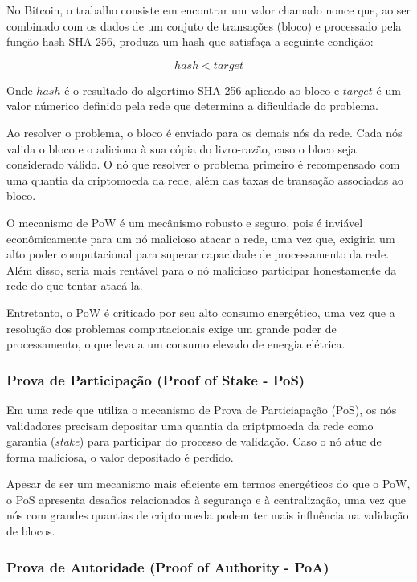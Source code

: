 No Bitcoin, o trabalho consiste em encontrar um valor chamado nonce
que, ao ser combinado com os dados de um conjuto de transações
(bloco) e processado pela função
hash SHA-256, produza um hash que satisfaça a seguinte condição:

$$
hash < target
$$

Onde $hash$ é o resultado do algortimo SHA-256 aplicado ao bloco e
$target$ é um valor númerico definido pela rede que determina a
dificuldade do problema.
\cite{EthereumWhitepaper}

Ao resolver o problema, o bloco é enviado para os demais nós da rede.
Cada nós valida o bloco e o adiciona à sua cópia do livro-razão, caso
o bloco seja considerado válido. O nó que resolver o problema
primeiro é recompensado com uma quantia da criptomoeda da rede, além
das taxas de transação associadas ao bloco.

O mecanismo de PoW é um mecânismo robusto e seguro, pois é inviável
econômicamente para um nó malicioso atacar a rede, uma vez que,
exigiria um alto poder computacional para superar capacidade de
processamento da rede.
Além disso, seria mais rentável para o nó malicioso participar
honestamente da rede
do que tentar atacá-la.

Entretanto, o PoW é criticado por seu alto consumo energético, uma vez
que a resolução dos problemas computacionais exige um grande poder
de processamento, o que leva a um consumo elevado de energia elétrica.
\cite{BitcoinEnergyConsumption}

\subsubsection{Prova de Participação (Proof of Stake - PoS)}

Em uma rede que utiliza o mecanismo de Prova de Particiapação (PoS),
os nós validadores
precisam depositar uma quantia da criptpmoeda da rede como garantia
(\textit{stake})
para participar do processo de validação. Caso o nó atue de forma
maliciosa, o valor depositado
é perdido. \cite{ethereum-docs}

Apesar de ser um mecanismo mais eficiente em termos energéticos do que o PoW,
o PoS apresenta desafios relacionados à segurança e à centralização,
uma vez que nós com grandes quantias de criptomoeda podem ter mais
influência na validação de blocos.

\subsubsection{Prova de Autoridade (Proof of Authority - PoA)}


